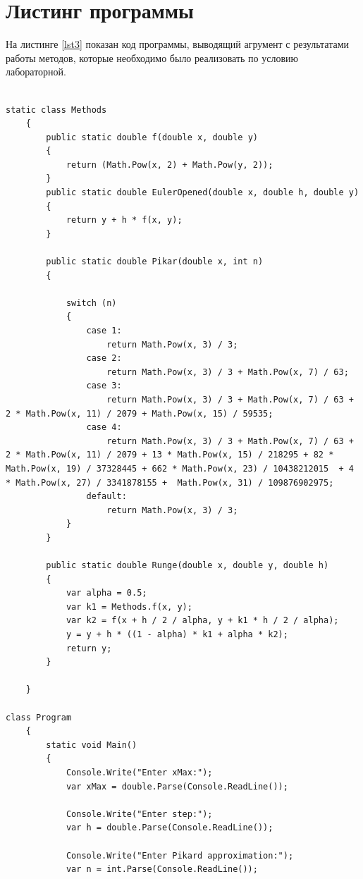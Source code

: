 \chapter{Листинг программы}

На листинге \ref{lst3} показан код программы, выводящий агрумент с результатами работы методов, которые необходимо было реализовать по условию лабораторной.

\begin{lstlisting}[caption=код программы, label=lst3]

static class Methods
    {
        public static double f(double x, double y) 
        {
            return (Math.Pow(x, 2) + Math.Pow(y, 2));
        }
        public static double EulerOpened(double x, double h, double y) 
        { 
            return y + h * f(x, y);
        }

        public static double Pikar(double x, int n) 
        {
            
            switch (n)
            {
                case 1:
                    return Math.Pow(x, 3) / 3;
                case 2:
                    return Math.Pow(x, 3) / 3 + Math.Pow(x, 7) / 63;
                case 3:
                    return Math.Pow(x, 3) / 3 + Math.Pow(x, 7) / 63 + 2 * Math.Pow(x, 11) / 2079 + Math.Pow(x, 15) / 59535;
                case 4:
                    return Math.Pow(x, 3) / 3 + Math.Pow(x, 7) / 63 + 2 * Math.Pow(x, 11) / 2079 + 13 * Math.Pow(x, 15) / 218295 + 82 * Math.Pow(x, 19) / 37328445 + 662 * Math.Pow(x, 23) / 10438212015  + 4 * Math.Pow(x, 27) / 3341878155 +  Math.Pow(x, 31) / 109876902975;
                default:
                    return Math.Pow(x, 3) / 3;
            }
        }

        public static double Runge(double x, double y, double h)
        {
            var alpha = 0.5;
            var k1 = Methods.f(x, y);
            var k2 = f(x + h / 2 / alpha, y + k1 * h / 2 / alpha);
            y = y + h * ((1 - alpha) * k1 + alpha * k2);
            return y;
        }
        
    }

class Program
    {
        static void Main()
        {
            Console.Write("Enter xMax:");
            var xMax = double.Parse(Console.ReadLine());

            Console.Write("Enter step:");
            var h = double.Parse(Console.ReadLine());

            Console.Write("Enter Pikard approximation:");
            var n = int.Parse(Console.ReadLine());


\end{lstlisting}
